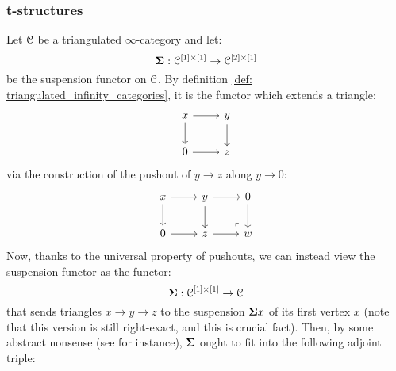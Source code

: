             \subsubsection{t-structures}
                \begin{remark} \label{remark: suspensions_and_loops}
                    Let $\mathcal{C}$ be a triangulated $\infty$-category and let:
                        $$\suspension: \C^{[1] \x [1]} \to \C^{[2] \x [1]}$$
                    be the suspension functor on $\mathcal{C}$. By definition \ref{def: triangulated_infinity_categories}, it is the functor which extends a triangle:
                        $$
                            \begin{tikzcd}
                            	x & y \\
                            	0 & z
                            	\arrow[from=1-1, to=2-1]
                            	\arrow[from=1-1, to=1-2]
                            	\arrow[from=1-2, to=2-2]
                            	\arrow[from=2-1, to=2-2]
                            \end{tikzcd}
                        $$
                    via the construction of the pushout of $y \to z$ along $y \to 0$:
                        $$
                            \begin{tikzcd}
                            	x & y & 0 \\
                            	0 & z & w
                            	\arrow[from=1-1, to=2-1]
                            	\arrow[from=1-1, to=1-2]
                            	\arrow[from=1-2, to=2-2]
                            	\arrow[from=2-1, to=2-2]
                            	\arrow[from=1-2, to=1-3]
                            	\arrow[from=1-3, to=2-3]
                            	\arrow[from=2-2, to=2-3]
                            	\arrow["\lrcorner"{anchor=center, pos=0.125, rotate=180}, draw=none, from=2-3, to=1-2]
                            \end{tikzcd}
                        $$
                    Now, thanks to the universal property of pushouts, we can instead view the suspension functor as the functor:
                        $$\suspension: \C^{[1] \x [1]} \to \C$$
                    that sends triangles $x \to y \to z$ to the suspension $\mathbf{\Sigma} x$ of its first vertex $x$ (note that this version is still right-exact, and this is crucial fact). Then, by some abstract nonsense (see \cite[Section 3]{nlab:infinity-1-limit} for instance), $\mathbf{\Sigma}$ ought to fit into the following adjoint triple:

\end{remark}
